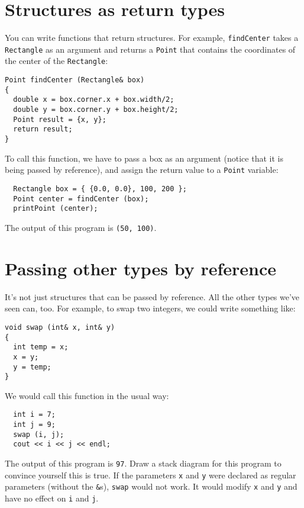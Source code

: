

\section{Structures as return types}

You can write functions that return structures.  For example,
{\tt findCenter} takes a {\tt Rectangle} as an argument and
returns a {\tt Point} that contains the coordinates of the
center of the {\tt Rectangle}:

\begin{verbatim}
Point findCenter (Rectangle& box)
{
  double x = box.corner.x + box.width/2;
  double y = box.corner.y + box.height/2;
  Point result = {x, y};
  return result;
}
\end{verbatim}
%
To call this function, we have to pass a box as an argument
(notice that it is being passed by reference), and assign the
return value to a {\tt Point} variable:

\begin{verbatim}
  Rectangle box = { {0.0, 0.0}, 100, 200 };
  Point center = findCenter (box);
  printPoint (center);
\end{verbatim}
%
The output of this program is {\tt (50, 100)}.

\section {Passing other types by reference}

It's not just structures that can be passed by reference.
All the other types we've seen can, too.  For example, to swap
two integers, we could write something like:

\begin{verbatim}
void swap (int& x, int& y)
{
  int temp = x;
  x = y;
  y = temp;
}
\end{verbatim}
%
We would call this function in the usual way:

\begin{verbatim}
  int i = 7;
  int j = 9;
  swap (i, j);
  cout << i << j << endl;
\end{verbatim}
%
The output of this program is {\tt 97}.  Draw a stack
diagram for this program to convince yourself this is true.
If the parameters {\tt x} and {\tt y} were declared as
regular parameters (without the {\tt \&}s), {\tt swap} would
not work.  It would modify {\tt x} and {\tt y} and have no
effect on {\tt i} and {\tt j}.

